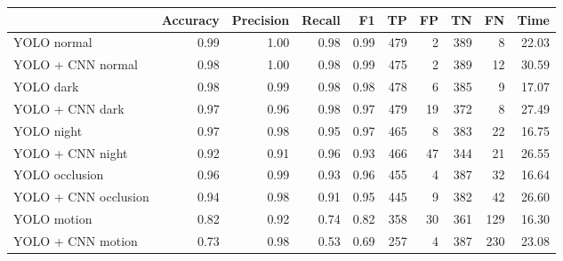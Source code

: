 \setlength{\tabcolsep}{12pt}
\begin{tabular}{lrrrrrrrrr}
\toprule
 & Accuracy & Precision & Recall & F1 & TP & FP & TN & FN & Time \\
\midrule
YOLO normal & 0.99 & 1.00 & 0.98 & 0.99 & 479 & 2 & 389 & 8 & 22.03 \\
YOLO + CNN normal & 0.98 & 1.00 & 0.98 & 0.99 & 475 & 2 & 389 & 12 & 30.59 \\
YOLO dark & 0.98 & 0.99 & 0.98 & 0.98 & 478 & 6 & 385 & 9 & 17.07 \\
YOLO + CNN dark & 0.97 & 0.96 & 0.98 & 0.97 & 479 & 19 & 372 & 8 & 27.49 \\
YOLO night & 0.97 & 0.98 & 0.95 & 0.97 & 465 & 8 & 383 & 22 & 16.75 \\
YOLO + CNN night & 0.92 & 0.91 & 0.96 & 0.93 & 466 & 47 & 344 & 21 & 26.55 \\
YOLO occlusion & 0.96 & 0.99 & 0.93 & 0.96 & 455 & 4 & 387 & 32 & 16.64 \\
YOLO + CNN occlusion & 0.94 & 0.98 & 0.91 & 0.95 & 445 & 9 & 382 & 42 & 26.60 \\
YOLO motion & 0.82 & 0.92 & 0.74 & 0.82 & 358 & 30 & 361 & 129 & 16.30 \\
YOLO + CNN motion & 0.73 & 0.98 & 0.53 & 0.69 & 257 & 4 & 387 & 230 & 23.08 \\
\bottomrule
\end{tabular}
